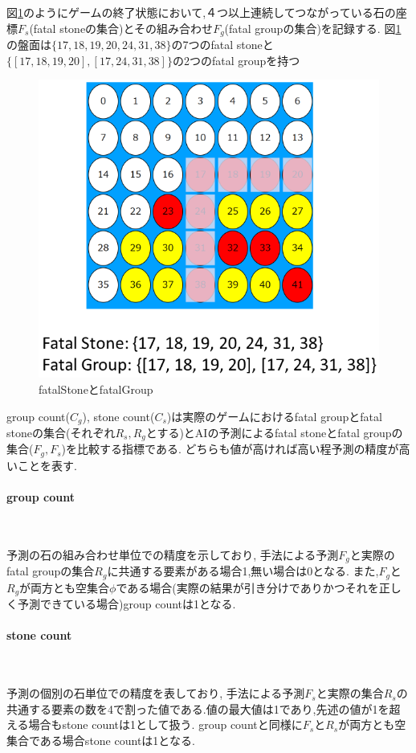 図\ref{fig:fatalGroup}のようにゲームの終了状態において,４つ以上連続してつながっている石の座標$F_s$(fatal stoneの集合)とその組み合わせ$F_g$(fatal groupの集合)を記録する.
図\ref{fig:fatalGroup}の盤面は$\{17, 18, 19, 20, 24, 31, 38\}$の7つのfatal stoneと$\{[17, 18, 19, 20], [17, 24, 31, 38]\}$の2つのfatal groupを持つ
\begin{figure}[t]
	\centering
	\includegraphics[width=\linewidth]{./figure/fatalGroup.png}
	\caption{fatalStoneとfatalGroup}
	\label{fig:fatalGroup}
\end{figure}
group count($C_g$), stone count($C_s$)は実際のゲームにおけるfatal groupとfatal stoneの集合(それぞれ$R_s, R_g$とする)とAIの予測によるfatal stoneとfatal groupの集合($F_g, F_s$)を比較する指標である.
どちらも値が高ければ高い程予測の精度が高いことを表す.


\paragraph{group count}~
\par 予測の石の組み合わせ単位での精度を示しており,
手法による予測$F_g$と実際のfatal groupの集合$R_g$に共通する要素がある場合1,無い場合は0となる.
また,$F_g$と$R_g$が両方とも空集合$\phi$である場合(実際の結果が引き分けでありかつそれを正しく予測できている場合)group countは1となる.
\paragraph{stone count}~
\par 予測の個別の石単位での精度を表しており,
手法による予測$F_s$と実際の集合$R_s$の共通する要素の数を4で割った値である.値の最大値は1であり,先述の値が1を超える場合もstone countは1として扱う.
group countと同様に$F_s$と$R_s$が両方とも空集合である場合stone countは1となる.


